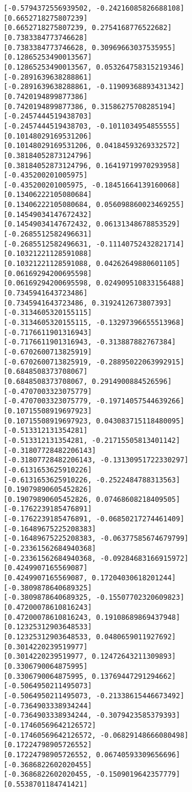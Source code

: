 \documentclass[11pt]{article}
\begin{document}
\begin{Verbatim}[commandchars=\\\{\}]
[-0.5794372556939502, -0.24216085826688108]
[0.6652718275807239]
[0.6652718275807239, 0.2754168776522682]
[0.7383384773746628]
[0.7383384773746628, 0.30969663037535955]
[0.12865253490013567]
[0.12865253490013567, 0.053264758315219346]
[-0.2891639638288861]
[-0.2891639638288861, -0.11909368893431342]
[0.7420194899877386]
[0.7420194899877386, 0.31586275708285194]
[-0.2457444519438703]
[-0.2457444519438703, -0.1011034954855555]
[0.10148029169531206]
[0.10148029169531206, 0.04184593269332572]
[0.38184052873124796]
[0.38184052873124796, 0.16419719970293958]
[-0.435200201005975]
[-0.435200201005975, -0.18451664139160068]
[0.13406222105080684]
[0.13406222105080684, 0.056098860023469255]
[0.14549034147672432]
[0.14549034147672432, 0.06131348678853529]
[-0.2685512582496631]
[-0.2685512582496631, -0.11140752432821714]
[0.10321221128591088]
[0.10321221128591088, 0.04262649880601105]
[0.06169294200695598]
[0.06169294200695598, 0.024909510833156488]
[0.7345941643723486]
[0.7345941643723486, 0.3192412673807393]
[-0.3134605320155115]
[-0.3134605320155115, -0.13297396655513968]
[-0.7176611901316943]
[-0.7176611901316943, -0.313887882767384]
[-0.6702600713825919]
[-0.6702600713825919, -0.28895022063992915]
[0.6848508373708067]
[0.6848508373708067, 0.2914900884526596]
[-0.4707003323075779]
[-0.4707003323075779, -0.19714057544639266]
[0.10715508919697923]
[0.10715508919697923, 0.043083715118480095]
[-0.513312131354281]
[-0.513312131354281, -0.21715505813401142]
[-0.31807728482206143]
[-0.31807728482206143, -0.13130951722330297]
[-0.6131653625910226]
[-0.6131653625910226, -0.2522484788313563]
[0.19079890605452826]
[0.19079890605452826, 0.07468608218409505]
[-0.1762239185476891]
[-0.1762239185476891, -0.06850217274461409]
[-0.16489675225208383]
[-0.16489675225208383, -0.06377585674679799]
[-0.23361562684940368]
[-0.23361562684940368, -0.09284683166915972]
[0.4249907165569087]
[0.4249907165569087, 0.17204030618201244]
[-0.3809878640689325]
[-0.3809878640689325, -0.15507702320609823]
[0.47200078610816243]
[0.47200078610816243, 0.19108689869437948]
[0.12325312903648533]
[0.12325312903648533, 0.0480659011927692]
[0.3014220239519977]
[0.3014220239519977, 0.12472643211309893]
[0.3306790064875995]
[0.3306790064875995, 0.13769447291294662]
[-0.5064950211495073]
[-0.5064950211495073, -0.21338615446673492]
[-0.7364903338934244]
[-0.7364903338934244, -0.3079423585379393]
[-0.17460569642126572]
[-0.17460569642126572, -0.06829148666080498]
[0.17224798905726552]
[0.17224798905726552, 0.06740593309656696]
[-0.3686822602020455]
[-0.3686822602020455, -0.1509019642357779]
[0.5538701184741421]

\end{Verbatim}
\end{document}
